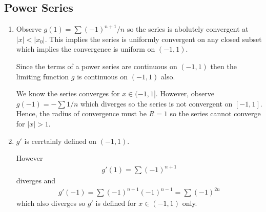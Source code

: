 \subsection{Power Series}

\begin{enumerate}[label=(\alph*)]
    \item 
    Observe $g(1)=\sum (-1)^{n+1}/n$ so the series 
    is abolutely convergent at $|x|<|x_0|$.
    This implies the series is uniformly convergent on 
    any closed subset which implies the convergence is 
    uniform on $(-1,1)$.

    Since the terms of a power series are continuous on $(-1,1)$
    then the limiting function $g$ is continuous on $(-1,1)$ also.

    We know the series converges for $x\in (-1,1]$. However, 
    observe $g(-1) = - \sum 1/n$ which diverges so the series is 
    not convergent on $[-1,1]$. Hence, the radius of convergence 
    must be $R=1$ so the series cannot converge for $|x|>1$.

    \item
    $g'$ is cerrtainly defined on $(-1,1)$.

    However
    \begin{align*}
        g'(1) = \sum (-1)^{n+1}
    \end{align*}
    diverges and 
    \begin{align*}
        g'(-1) = \sum (-1)^{n+1} (-1)^{n-1} = \sum (-1)^{2n}
    \end{align*}
    which also diverges so $g'$ is defined for $x\in(-1,1)$ only.
\end{enumerate}


